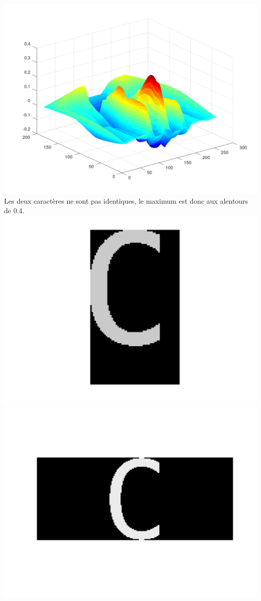 \documentclass[a4paper,12pt,titlepage]{report}
\begin{document}
	\includegraphics[scale=0.25]{../illus/2cor.png}
	Les deux caractères ne sont pas identiques, le maximum est donc aux alentours de 0.4.
	\\
	\includegraphics[scale=0.25]{../illus/tuilev.png}
	\includegraphics[scale=0.25]{../illus/2echv.png}
\end{document}

